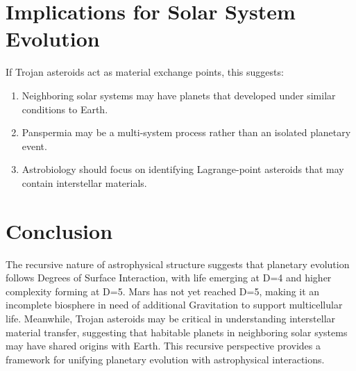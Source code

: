 \documentclass{article}
\begin{document}
\section{Implications for Solar System Evolution}
If Trojan asteroids act as material exchange points, this suggests:
\begin{enumerate}
    \item Neighboring solar systems may have planets that developed under similar conditions to Earth.
    \item Panspermia may be a multi-system process rather than an isolated planetary event.
    \item Astrobiology should focus on identifying Lagrange-point asteroids that may contain interstellar materials.
\end{enumerate}

\section{Conclusion}
The recursive nature of astrophysical structure suggests that planetary evolution follows Degrees of Surface Interaction, with life emerging at D=4 and higher complexity forming at D=5. Mars has not yet reached D=5, making it an incomplete biosphere in need of additional Gravitation to support multicellular life. Meanwhile, Trojan asteroids may be critical in understanding interstellar material transfer, suggesting that habitable planets in neighboring solar systems may have shared origins with Earth. This recursive perspective provides a framework for unifying planetary evolution with astrophysical interactions.
\end{document}
